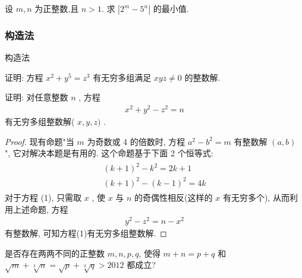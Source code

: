 \documentclass[aspectratio=169]{ctexbeamer}
\theoremstyle{definition}
\begin{document}
\begin{frame}[t]
\begin{example}
	设 $m ,  n$ 为正整数,且 $n>1$. 求 $\left|2^{m}-5^{n}\right|$ 的最小值.
\end{example}
\end{frame}

\subsubsection*{构造法}

\begin{frame}[t]{构造法}
\begin{example}
	证明: 方程 $x^{2}+y^{5}=z^{3}$ 有无穷多组满足 $x y z \neq 0$ 的整数解.
\end{example}
\end{frame}

\begin{frame}[t]
\begin{example}
	证明: 对任意整数 $n$ , 方程
	\begin{align*}
		x^{2}+y^{2}-z^{2}=n
	\end{align*}
	有无穷多组整数解( $x, y, z)$ .
\end{example}
\pause
\begin{proof}
	现有命题"当 $m$ 为奇数或 4 的倍数时, 方程 $a^{2}-b^{2}=m$ 有整数解 $(a, b)$ ", 它对解决本题是有用的. 这个命题基于下面 2 个恒等式:
	\begin{align*}
		\begin{gathered}
			(k+1)^{2}-k^{2}=2 k+1 \\
			(k+1)^{2}-(k-1)^{2}=4 k
		\end{gathered}
	\end{align*}
	对于方程 (1), 只需取 $x$ , 使 $x$ 与 $n$ 的奇偶性相反(这样的 $x$ 有无穷多个), 从而利用上述命题, 方程
	\begin{align*}
		y^{2}-z^{2}=n-x^{2}
	\end{align*}
	有整数解, 可知方程(1)有无穷多组整数解.
\end{proof}
\end{frame}

\begin{frame}[t]
\begin{example}
	是否存在两两不同的正整数 $m ,  n ,  p ,  q$, 使得 $m+n=p+q$ 和 $\sqrt{m}+\sqrt[3]{n}=\sqrt{p}+\sqrt[3]{q}>2012$ 都成立?
\end{example}
\end{frame}
\end{document}
